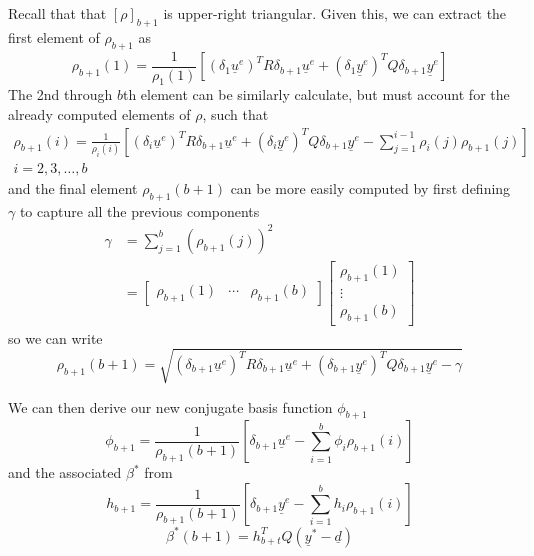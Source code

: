 Recall that that ${{\left[\rho\right]}_{b+1}}$ is upper-right triangular. Given this, we can extract the first element of $\rho_{b+1}$ as
\begin{equation}
    \rho_{b+1}(1) = \frac{1}{\rho_1(1)} \left[{(\delta_1 \underline{u}^e)}^T R \delta_{b+1} \underline{u}^e + {(\delta_1 \underline{y}^e)}^T Q \delta_{b+1} \underline{y}^e \right]
    \label{eq:first_rho_iterative}
\end{equation}
The 2nd through $b$th element can be similarly calculate, but must account for the already computed elements of $\rho$, such that
\begin{equation}
    \begin{split}
        \rho_{b+1}(i) = \frac{1}{\rho_i(i)} \left[{(\delta_i \underline{u}^e)}^T R \delta_{b+1} \underline{u}^e + {(\delta_i \underline{y}^e)}^T Q \delta_{b+1} \underline{y}^e - \sum_{j=1}^{i-1} \rho_i(j)\rho_{b+1}(j)\right] \\
        i = 2, 3, \ldots, b
    \end{split}
    \label{eq:middle_rho_iterative}
\end{equation}
and the final element $\rho_{b+1}(b+1)$ can be more easily computed by first defining $\gamma$ to capture all the previous components
\begin{equation}
    \begin{split}
        \gamma &= \sum_{j=1}^{b} {(\rho_{b+1}(j))}^2    \\
        &= 
        \begin{bmatrix}
            \rho_{b+1}(1) & \cdots & \rho_{b+1}(b)
        \end{bmatrix}
        \begin{bmatrix}
            \rho_{b+1}(1) \\ \vdots \\ \rho_{b+1}(b)
        \end{bmatrix}
    \end{split}
\end{equation}
so we can write
\begin{equation}
    \rho_{b+1}(b+1) = \sqrt{{(\delta_{b+1} \underline{u}^e)}^T R \delta_{b+1} \underline{u}^e + {(\delta_{b+1} \underline{y}^e)}^T Q \delta_{b+1} \underline{y}^e - \gamma}
    \label{eq:last_rho_iterative}
\end{equation}

We can then derive our new conjugate basis function $\phi_{b+1}$
\begin{equation}
    \phi_{b+1} = \frac{1}{\rho_{b+1}(b+1)} \left[\delta_{b+1} \underline{u}^e - \sum_{i=1}^{b}\phi_i \rho_{b+1}(i)\right]
    \label{eq:new_phi_iterative}
\end{equation}
and the associated $\beta^\ast$ from
\begin{equation}
    h_{b+1} = \frac{1}{\rho_{b+1}(b+1)}\left[\delta_{b+1}\underline{y}^e - \sum_{i=1}^{b}h_i\rho_{b+1}(i)\right]
    \label{eq:new_h_iterative}
\end{equation}
\begin{equation}
    \beta^\ast(b+1) = h_{b+t}^T Q (\underline{y}^\ast - \underline{d})
    \label{eq:new_beta_iterative}
\end{equation}

